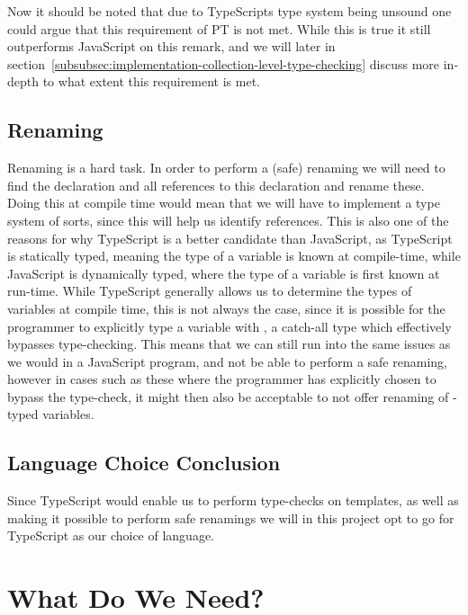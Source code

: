 Now it should be noted that due to TypeScripts type system being unsound one could argue that this requirement of PT is not met.
While this is true it still outperforms JavaScript on this remark, and we will later in section~\vref{subsubsec:implementation-collection-level-type-checking} discuss more in-depth to what extent this requirement is met.

\subsection{Renaming}\label{subsec:ts-vs-js-renaming}

Renaming is a hard task.
In order to perform a (safe) renaming we will need to find the declaration and all references to this declaration and rename these.
Doing this at compile time would mean that we will have to implement a type system of sorts, since this will help us identify references.
This is also one of the reasons for why TypeScript is a better candidate than JavaScript, as TypeScript is statically typed, meaning the type of a variable is known at compile-time, while JavaScript is dynamically typed, where the type of a variable is first known at run-time.
While TypeScript generally allows us to determine the types of variables at compile time, this is not always the case, since it is possible for the programmer to explicitly type a variable with , a catch-all type which effectively bypasses type-checking.
This means that we can still run into the same issues as we would in a JavaScript program, and not be able to perform a safe renaming, however in cases such as these where the programmer has explicitly chosen to bypass the type-check, it might then also be acceptable to not offer renaming of -typed variables.

\subsection{Language Choice Conclusion}\label{subsec:langauge-choice-conclusion}

Since TypeScript would enable us to perform type-checks on templates, as well as making it possible to perform safe renamings we will in this project opt to go for TypeScript as our choice of language.

\section{What Do We Need?}\label{sec:what-do-we-need}

